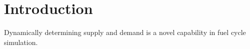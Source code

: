 \section{Introduction}


Dynamically determining supply and demand is a novel capability in fuel cycle simulation. 
